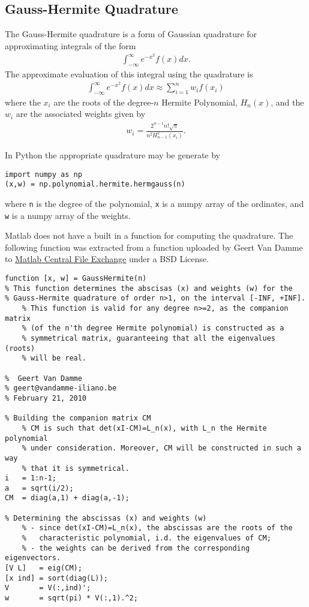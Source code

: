 \documentclass[11pt]{article}
\begin{document}
\subsection{Gauss-Hermite Quadrature}
\label{sec:orgheadline10}
The Gauss-Hermite quadrature is a form of Gaussian quadrature for approximating integrals of the form
\begin{align}
  \int_{-\infty}^\infty e^{-x^2} f(x) dx.
\end{align}
The approximate evaluation of this integral using the quadrature is
\begin{align}
  \int_{-\infty}^\infty e^{-x^2} f(x) dx \approx \sum_{i=1}^n w_i f(x_i)
\end{align}
where the \(x_i\) are the roots of the degree-\(n\) Hermite Polynomial, \(H_n(x)\), and the \(w_i\) are the associated weights given by
\begin{align}
  w_i = \frac{2^{n-1} n! \sqrt{\pi}}{n^2 H_{n-1}^2(x_i)}.
\end{align}

In Python the appropriate quadrature may be generate by
\begin{verbatim}
import numpy as np
(x,w) = np.polynomial.hermite.hermgauss(n)
\end{verbatim}
where \texttt{n} is the degree of the polynomial, \texttt{x} is a numpy array of the ordinates, and \texttt{w} is a numpy array of the weights.

Matlab does not have a built in a function for computing the quadrature.  The following function was extracted from a function uploaded by Geert Van Damme to \href{http://www.mathworks.com/matlabcentral/fileexchange/26737-legendre-laguerre-and-hermite-gauss-quadrature/content/GaussHermite.m}{Matlab Central File Exchange} under a BSD License.
\begin{verbatim}
function [x, w] = GaussHermite(n)
% This function determines the abscisas (x) and weights (w) for the
% Gauss-Hermite quadrature of order n>1, on the interval [-INF, +INF].
    % This function is valid for any degree n>=2, as the companion matrix
    % (of the n'th degree Hermite polynomial) is constructed as a
    % symmetrical matrix, guaranteeing that all the eigenvalues (roots)
    % will be real.

%  Geert Van Damme
% geert@vandamme-iliano.be
% February 21, 2010    

% Building the companion matrix CM
    % CM is such that det(xI-CM)=L_n(x), with L_n the Hermite polynomial
    % under consideration. Moreover, CM will be constructed in such a way
    % that it is symmetrical.
i   = 1:n-1;
a   = sqrt(i/2);
CM  = diag(a,1) + diag(a,-1);

% Determining the abscissas (x) and weights (w)
    % - since det(xI-CM)=L_n(x), the abscissas are the roots of the
    %   characteristic polynomial, i.d. the eigenvalues of CM;
    % - the weights can be derived from the corresponding eigenvectors.
[V L]   = eig(CM);
[x ind] = sort(diag(L));
V       = V(:,ind)';
w       = sqrt(pi) * V(:,1).^2;
\end{verbatim}
\end{document}
